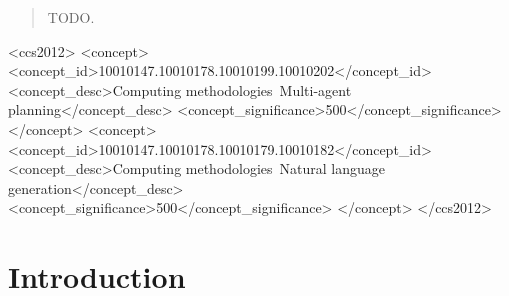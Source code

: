 \documentclass[manuscript,review,anonymous]{acmart}
\begin{document}
\begin{abstract}
TODO.
\end{abstract}

\begin{CCSXML}
<ccs2012>
   <concept>
       <concept_id>10010147.10010178.10010199.10010202</concept_id>
       <concept_desc>Computing methodologies~Multi-agent planning</concept_desc>
       <concept_significance>500</concept_significance>
       </concept>
   <concept>
       <concept_id>10010147.10010178.10010179.10010182</concept_id>
       <concept_desc>Computing methodologies~Natural language generation</concept_desc>
       <concept_significance>500</concept_significance>
       </concept>
 </ccs2012>
\end{CCSXML}




\maketitle

\section{Introduction}
\end{document}
